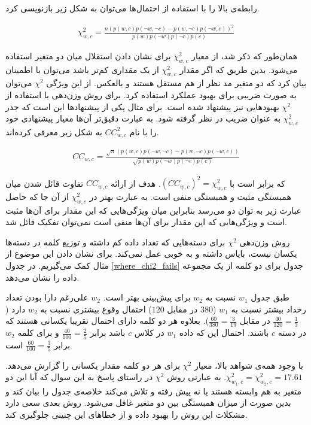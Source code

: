 \documentclass[12pt, a4paper]{article}
\begin{document}
رابطه‌ی بالا را با استفاده از احتمال‌ها می‌توان به شکل زیر بازنویسی کرد.

\begin{eqnarray}
    \chi_{w, c}^2 = \frac{n(p(w, c) p(\lnot w, \lnot c) - p(w, \lnot c) p(\lnot w, c))^2}{p(w)p(\lnot w)p(\lnot c)p(c)}
\end{eqnarray}

همان‌طور که ذکر شد، از معیار $\chi_{w, c}^2$ برای نشان دادن استقلال میان دو
متغیر استفاده می‌شود. بدین طریق که اگر مقدار $\chi_{w, c}^2$ از یک مقداری
کم‌تر باشد می‌توان با اطمینان بیان کرد که دو متغیر مد نظر از هم مستقل هستند و بالعکس.
از این ویژگی $\chi^2$ می‌توان به صورت ضریبی برای بهبود عملکرد
 استفاده کرد. برای روش وزن‌دهی با استفاده از $\chi^2$
بهبود‌هایی نیز پیشنهاد شده است. برای مثال یکی از پیشنهاد‌ها این است
که جذر $\chi_{w, c}^2$ به عنوان ضریب در نظر گرفته شود.
به عبارت دقیق‌تر آن‌ها معیار پیشنهادی خود را با نام $CC_{w, c}^2$
به شکل زیر معرفی کرده‌اند.

\begin{eqnarray}
    CC_{w, c} = \frac{\sqrt{n}(p(w, c) p(\lnot w, \lnot c) - p(w, \lnot c) p(\lnot w, c))}{\sqrt{p(w)p(\lnot w)p(\lnot c)p(c)}}
\end{eqnarray}

که برابر است با $(CC_{w, c})^2 = \chi_{w, c}^2$.
هدف از ارائه $CC_{w, c}$ تفاوت قائل شدن میان همبستگی مثبت و همبستگی منفی است.
به عبارت بهتر در $\chi_{w, c}^2$ از آن جا که حاصل عبارت زیر به توان دو می‌رسد
بنابراین میان ویژگی‌هایی که این مقدار برای آن‌ها مثبت است و ویژگی‌هایی که
این مقدار برای آن‌ها منفی است نمی‌توان تفکیک قائل شد.

روش وزن‌دهی $\chi^2$ برای دسته‌هایی که تعداد داده کم داشته و
توزیع کلمه در دسته‌ها یکسان نیست، بایاس داشته
و به خوبی عمل نمی‌کند. برای نشان دادن این موضوع از مثال کمک می‌گیریم. در جدول
\ref{where_chi2_fails} جدول  برای دو کلمه از یک مجموعه داده
را نشان می‌دهد.

طبق جدول $w_1$ نسبت به $w_2$ برای پیش‌بینی بهتر است. $w_2$ علی‌رغم دارا بودن
تعداد رخداد بیشتر نسبت به $w_1$ ($380$ در مقابل $120$)
احتمال وقوع بیشتری نسبت به $w_2$ دارد
($\frac{40}{120}=\frac{1}{3}$ در مقابل $\frac{60}{380}=\frac{3}{19}$).
بعلاوه هر دو کلمه دارای احتمال تقریبا یکسانی هستند که در دسته $c$ باشند.
احتمال این که داده $w_1$ در کلاس $c$ باشد برابر
$\frac{40}{100}=\frac{2}{5}$ و برای کلمه $w_2$ برابر
$\frac{60}{100}=\frac{3}{5}$ است.

با وجود همه‌ی شواهد بالا، معیار $\chi^2$ برای هر دو کلمه مقدار یکسانی را گزارش می‌دهد.
$\chi^2_{w_1, c} = \chi^2_{w_2, c} = 17.61$. به عبارتی
روش $\chi^2$ در راستای پاسخ به این سوال که آیا این دو متغیر به هم وابسته هستند یا نه
پیش رفته و تلاش می‌کند خلاصه‌ی جدول  را بیان کند و بدین صورت
از میزان همبستگی بین دو متغیر غافل می‌شود. روش بعدی سعی دارد مشکلات این روش
را بهبود داده و از خطاهای این چنینی جلوگیری کند.
\end{document}
